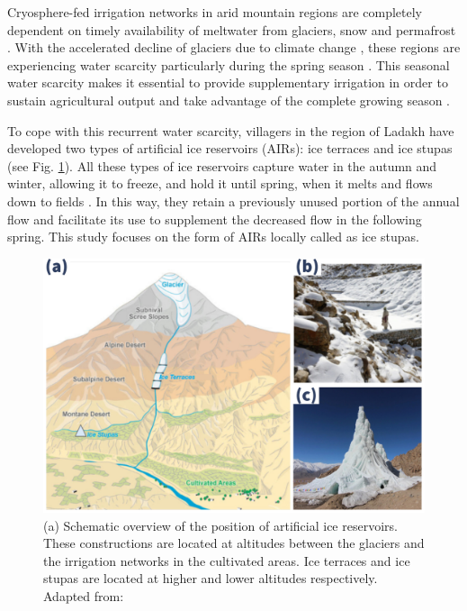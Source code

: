 \documentclass[tc, manuscript]{copernicus}
\begin{document}
\introduction

Cryosphere-fed irrigation networks in arid mountain regions are completely dependent on timely availability of
meltwater from glaciers, snow and permafrost \citep{immerzeelImportanceVulnerabilityWorld2020, farhanHydrologicalRegimesConjunction2015,
tveitenGlacierGrowingLocal2007}. With the accelerated decline of glaciers due to climate change
\citep{nusserLocalKnowledgeGlobal2016}, these regions are experiencing water scarcity particularly during the
spring season \citep{norphelSnowWaterHarvesting2015}. This seasonal water scarcity makes it essential to provide
supplementary irrigation in order to sustain agricultural output and take advantage of the complete growing
season \citep{nusserLocalKnowledgeGlobal2016, vincentEnergyClimateChange2009}.

To cope with this recurrent water scarcity, villagers in the region of Ladakh have developed two types of
artificial ice reservoirs (AIRs): ice terraces and ice stupas (see Fig. \ref{fig:AIRforms}).  All these types of
ice reservoirs capture water in the autumn and winter, allowing it to freeze, and hold it until spring, when it
melts and flows down to fields \citep{ipccChapterHighMountain2019, vinceGlacierMan2009,
clouseLadakhArtificialGlaciers2017, nusserSociohydrologyArtificialGlaciers2019}. In this way, they retain a
previously unused portion of the annual flow and facilitate its use to supplement the decreased flow in the
following spring. This study focuses on the form of AIRs locally called as ice stupas.

\begin{figure}[t]
\includegraphics[width=12cm]{Figures/AIR_forms.jpg}

\caption{(a) Schematic overview of the position of artificial ice reservoirs. These constructions are located at
altitudes between the glaciers and the irrigation networks in the cultivated areas. Ice terraces and ice stupas
are located at higher and lower altitudes respectively. Adapted from: \cite{nusserLocalKnowledgeGlobal2016}}

\label{fig:AIRforms}
\end{figure}
\end{document}
